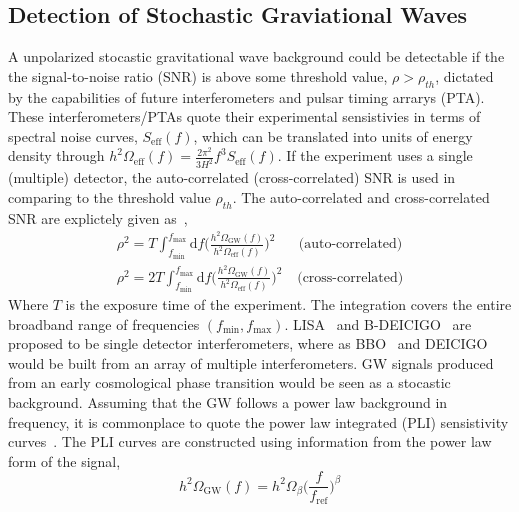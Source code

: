 \documentclass[nofootinbib,twocolumn,preprintnumbers]{revtex4-1}
\begin{document}
\subsection{Detection of Stochastic Graviational Waves}
\label{sec:detection}
A unpolarized stocastic gravitational wave background could be detectable if the the signal-to-noise ratio (SNR) is above some threshold value, $\rho > \rho_{th}$, dictated by the capabilities of future interferometers and pulsar timing arrarys (PTA). These interferometers/PTAs quote their experimental sensistivies in terms of spectral noise curves, $S_{\textrm{eff}}(f)$, which can be translated into units of energy density through $h^2 \Omega_{\textrm{eff}}(f) = \frac{2\pi^2}{3H^2}f^3 S_{\textrm{eff}}(f)$. If the experiment uses a single (multiple) detector, the auto-correlated (cross-correlated) SNR is used in comparing to the threshold value $\rho_{th}$. The auto-correlated and cross-correlated SNR are explictely given as~\cite{PhysRevD.59.102001},
\begin{equation}\label{eqn::SNR}
\begin{split}
\rho^2 =  T \int_{f_{\textrm{min}}}^{f_{\textrm{max}}}\textrm{d}f \bigg( \frac{h^2 \Omega_{\textrm{GW}}(f)}{h^2 \Omega_{\textrm{eff}}(f)} \bigg)^2 \;\;\;\;\;\; \textrm{(auto-correlated)}
\\
\rho^2 = 2 T \int_{f_{\textrm{min}}}^{f_{\textrm{max}}}\textrm{d}f \bigg( \frac{h^2 \Omega_{\textrm{GW}}(f)}{h^2 \Omega_{\textrm{eff}}(f)} \bigg)^2 \;\;\;\: \textrm{(cross-correlated)}
\end{split}
\end{equation}
Where $T$ is the exposure time of the experiment. The integration covers the entire broadband range of frequencies $(f_{\textrm{min}}, f_{\textrm{max}})$. LISA~\citep{Audley:2017drz} and B-DEICIGO~\citep{10.1093/ptep/pty078} are proposed to be single detector interferometers, where as BBO~\citep{PhysRevD.72.083005} and DEICIGO~\citep{Sato_2017} would be built from an array of multiple interferometers.
GW signals produced from an early cosmological phase transition would be seen as a stocastic background. Assuming that the GW follows a power law background in frequency, it is commonplace to quote the power law integrated (PLI) sensistivity curves~\cite{PhysRevD.88.124032}. The PLI curves are constructed using information from the power law form of the signal,
\begin{equation}
h^2 \Omega_{\textrm{GW}}(f) = h^2 \Omega_{\beta}  \bigg(\frac{f}{f_{\textrm{ref}}}\bigg)^{\beta}
\end{equation}
\end{document}

